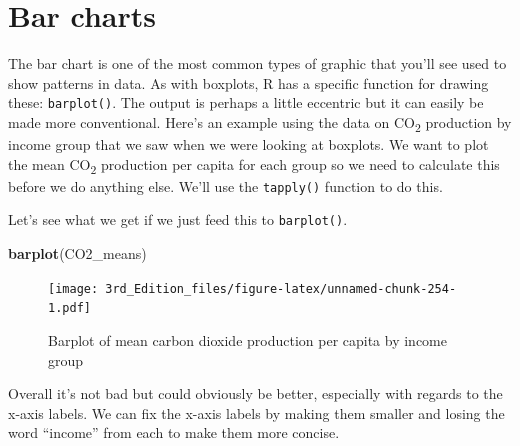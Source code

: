 \documentclass[
]{book}
\newenvironment{Shaded}{\begin{snugshade}}{\end{snugshade}}
\newcommand{\FloatTok}[1]{\textcolor[rgb]{0.00,0.00,0.81}{#1}}
\newcommand{\KeywordTok}[1]{\textcolor[rgb]{0.13,0.29,0.53}{\textbf{#1}}}
\newcommand{\NormalTok}[1]{#1}
\newcommand{\OperatorTok}[1]{\textcolor[rgb]{0.81,0.36,0.00}{\textbf{#1}}}
\newcommand{\StringTok}[1]{\textcolor[rgb]{0.31,0.60,0.02}{#1}}
\begin{document}
\hypertarget{bar-charts}{%
\section{Bar charts}\label{bar-charts}}

The bar chart is one of the most common types of graphic that you'll see used to show patterns in data. As with boxplots, R has a specific function for drawing these: \texttt{barplot()}. The output is perhaps a little eccentric but it can easily be made more conventional. Here's an example using the data on CO\textsubscript{2} production by income group that we saw when we were looking at boxplots. We want to plot the mean CO\textsubscript{2} production per capita for each group so we need to calculate this before we do anything else. We'll use the \texttt{tapply()} function to do this.

\begin{Shaded}
\end{Shaded}

Let's see what we get if we just feed this to \texttt{barplot()}.

\begin{Shaded}
\begin{Highlighting}[]
\KeywordTok{barplot}\NormalTok{(CO2_means)}
\end{Highlighting}
\end{Shaded}

\begin{figure}
\centering
\texttt{[image: 3rd\_Edition\_files/figure-latex/unnamed-chunk-254-1.pdf]}
\caption{\label{fig:unnamed-chunk-254}Barplot of mean carbon dioxide production per capita by income group}
\end{figure}

Overall it's not bad but could obviously be better, especially with regards to the x-axis labels. We can fix the x-axis labels by making them smaller and losing the word ``income'' from each to make them more concise.
\end{document}
